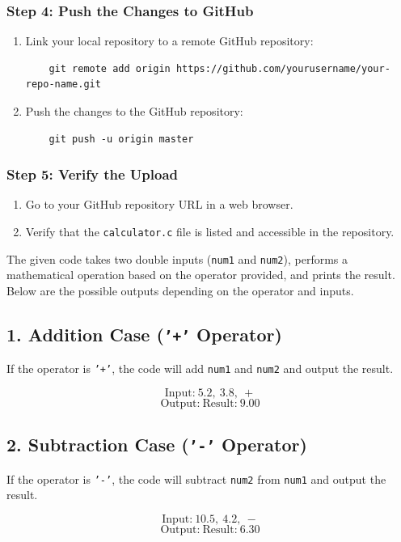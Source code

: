 \documentclass{article}
\begin{document}
\subsubsection{Step 4: Push the Changes to GitHub}
\begin{enumerate}
    \item Link your local repository to a remote GitHub repository:
    \begin{verbatim}
    git remote add origin https://github.com/yourusername/your-repo-name.git
    \end{verbatim}
    \item Push the changes to the GitHub repository:
    \begin{verbatim}
    git push -u origin master
    \end{verbatim}
\end{enumerate}

\subsubsection{Step 5: Verify the Upload}
\begin{enumerate}
    \item Go to your GitHub repository URL in a web browser.
    \item Verify that the \texttt{calculator.c} file is listed and accessible in the repository.
\end{enumerate}
The given code takes two double inputs (\texttt{num1} and \texttt{num2}), performs a mathematical operation based on the operator provided, and prints the result. Below are the possible outputs depending on the operator and inputs.

\subsection{1. Addition Case (\texttt{'+'} Operator)}
If the operator is \texttt{'+'}, the code will add \texttt{num1} and \texttt{num2} and output the result.

\[
\text{Input:} \ 5.2, \ 3.8, \ +
\]
\[
\text{Output:} \ \text{Result:} \ 9.00
\]

\subsection{2. Subtraction Case (\texttt{'-'} Operator)}
If the operator is \texttt{'-'}, the code will subtract \texttt{num2} from \texttt{num1} and output the result.

\[
\text{Input:} \ 10.5, \ 4.2, \ -
\]
\[
\text{Output:} \ \text{Result:} \ 6.30
\]
\end{document}
